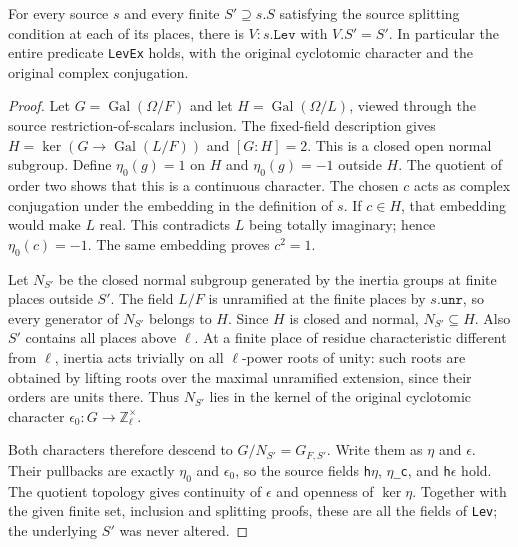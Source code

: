 \begin{theorem}
\label{claim:KX2}
For every source $s$ and every finite $S'\supseteq s.S$ satisfying
the source splitting condition at each of its places, there is
$V:s.\texttt{Lev}$ with $V.S'=S'$.  In particular the entire
predicate \texttt{LevEx} holds, with the original cyclotomic
character and the original complex conjugation.
\end{theorem}
\begin{proof}
Let $G=\operatorname{Gal}(\Omega/F)$ and let
$H=\operatorname{Gal}(\Omega/L)$, viewed through the source
restriction-of-scalars inclusion.  The fixed-field description gives
$H=\ker(G\to\operatorname{Gal}(L/F))$ and $[G:H]=2$.
This is a closed open normal subgroup.  Define
$\eta_0(g)=1$ on $H$ and $\eta_0(g)=-1$ outside $H$.
The quotient of order two shows that this is a continuous character.
The chosen $c$ acts as complex conjugation under the embedding in
the definition of $s$.  If $c\in H$, that embedding would make
$L$ real.  This contradicts $L$ being totally imaginary; hence
$\eta_0(c)=-1$.  The same embedding proves $c^2=1$.

Let $N_{S'}$ be the closed normal subgroup generated by the inertia
groups at finite places outside $S'$.  The field $L/F$ is unramified
at the finite places by $s.\texttt{unr}$, so every generator of
$N_{S'}$ belongs to $H$.  Since $H$ is closed and normal,
$N_{S'}\subseteq H$.  Also $S'$ contains all places above
$\ell$.  At a finite place of residue characteristic different from
$\ell$, inertia acts trivially on all $\ell$-power roots of unity:
such roots are obtained by lifting roots over the maximal unramified
extension, since their orders are units there.  Thus $N_{S'}$ lies
in the kernel of the original cyclotomic character
$\epsilon_0:G\to\mathbb Z_\ell^\times$.

Both characters therefore descend to $G/N_{S'}=G_{F,S'}$.
Write them as $\eta$ and $\epsilon$.  Their pullbacks are exactly
$\eta_0$ and $\epsilon_0$, so the source fields
\texttt{h\ensuremath{\eta}}, \texttt{\ensuremath{\eta}\_c}, and
\texttt{h\ensuremath{\epsilon}} hold.  The quotient topology gives
continuity of $\epsilon$ and openness of $\ker\eta$.
Together with the given finite set, inclusion and splitting proofs,
these are all the fields of \texttt{Lev}; the underlying $S'$ was
never altered.
\end{proof}


